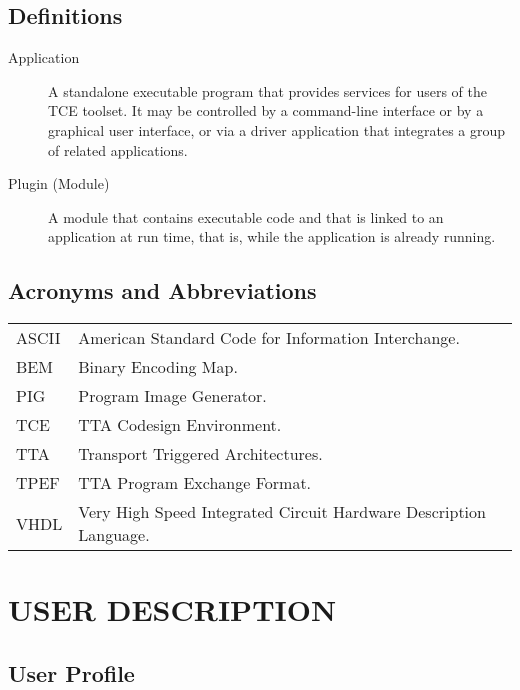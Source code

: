 \documentclass[a4paper,twoside]{tce}
\begin{document}
\section{Definitions}

\begin{description}
\item[Application]%
  A standalone executable program that provides services for users of the
  TCE toolset. It may be controlled by a command-line interface or by a
  graphical user interface, or via a driver application that integrates a
  group of related applications.
\item[Plugin (Module)]%
  A module that contains executable code and that is linked to an
  application at run time, that is, while the application is already
  running.
\end{description}

\section{Acronyms and Abbreviations}

\begin{tabular}{p{}p{}}
ASCII & American Standard Code for Information Interchange. \\
BEM   & Binary Encoding Map. \\
PIG   & Program Image Generator. \\
TCE   & TTA Codesign Environment. \\
TTA   & Transport Triggered Architectures. \\
TPEF  & TTA Program Exchange Format. \\
VHDL  & Very High Speed Integrated Circuit Hardware Description Language.\\
\end{tabular}


\chapter{USER DESCRIPTION}

\section{User Profile}
\end{document}
